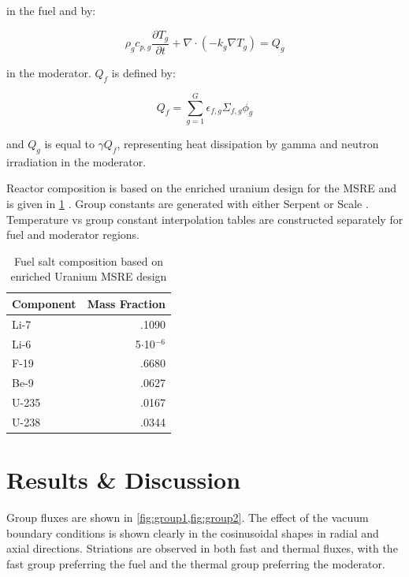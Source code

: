 \documentclass{article}
\let\Oldsection\section
\renewcommand{\section}{\FloatBarrier\Oldsection}
\begin{document}
in the fuel and by:

\begin{equation}
  \rho_gc_{p,g}\frac{\partial T_g}{\partial t} + \nabla\cdot\left(-k_g\nabla T_g\right) =  Q_g
  \label{eq:moderator_temp}
\end{equation}

in the moderator. $Q_f$ is defined by:

\begin{equation}
  Q_f = \sum_{g=1}^G \epsilon_{f,g}\Sigma_{f,g}\phi_g
  \label{eq:fuel_source}
\end{equation}

and $Q_g$ is equal to $\gamma Q_f$, representing heat dissipation by gamma and
neutron irradiation in the moderator.

Reactor composition is based on the enriched uranium design for the \gls{MSRE}
and is given in \cref{table:comp} \cite{robertson_msre_1965}. Group constants
are generated with either Serpent \cite{leppanen_serpent_2015} or Scale
\cite{dehart_reactor_2011}. Temperature vs group constant interpolation tables
are constructed separately for fuel and moderator regions.

\begin{table}[htpb]
  \begin{center}
    \begin{tabular}{l | r}
      Component & Mass Fraction\\\hline\hline
      Li-7 & .1090\\
      Li-6 & 5$\cdot$10$^{-6}$\\
      F-19 & .6680\\
      Be-9 & .0627\\
      U-235 & .0167\\
      U-238 & .0344\\
    \end{tabular}
  \end{center}
  \caption{Fuel salt composition based on enriched Uranium \gls{MSRE} design \cite{robertson_msre_1965}}
  \label{table:comp}
\end{table}


\section{Results \& Discussion}

Group fluxes are shown in \cref{fig:group1,fig:group2}. The effect of the vacuum
boundary conditions is shown clearly in the cosinusoidal shapes in radial and
axial directions. Striations are observed in both fast and thermal fluxes, with
the fast group preferring the fuel and the thermal group preferring the moderator.
\end{document}

